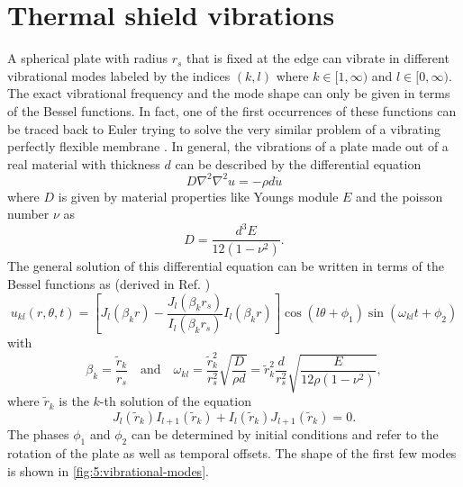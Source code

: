 \section{Thermal shield vibrations}\label{sec:5:thermal-vibrations}
A spherical plate with radius $r_s$ that is fixed at the edge can vibrate in different vibrational modes labeled by the indices $(k,l)$ where $k \in [1,\infty)$ and $l \in [0, \infty)$.
The exact vibrational frequency and the mode shape can only be given in terms of the Bessel functions. In fact, one of the first occurrences of these functions can be traced back to Euler trying to solve the very similar problem of a vibrating perfectly flexible membrane \cite{Dutka_1995}.
In general, the vibrations of a plate made out of a real material with thickness $d$ can be described by the differential equation \cite[p. 490]{Rao_2019}
\begin{equation}
  D \nabla^2\nabla^2 u = -\rho d \ddot{u}
\end{equation} 
where $D$ is given by material properties like Youngs module $E$ and the poisson number $\nu$ as
\begin{equation}
  D = \frac{d^3 E}{12(1-\nu^2)} .
\end{equation}
The general solution of this differential equation can be written in terms of the Bessel functions as (derived in Ref. \cite[p. 490-495]{Rao_2019}) 
\begin{equation}
  u_{kl}(r, \theta, t) = \left[J_l(\beta_k r) - \frac{J_l(\beta_k r_s)}{I_l(\beta_k r_s)}I_l(\beta_k r)\right]\cos(l\theta+\phi_1)\sin(\omega_{kl}t+\phi_2)
\end{equation}
with
\begin{equation} \label{eq:5:vibration-frequency}
  \beta_k = \frac{\tilde{r}_k}{r_s} \quad \text{and} \quad \omega_{kl} = \frac{\tilde{r}_k^2}{r_s^2}\sqrt{\frac{D}{\rho d}} = \tilde{r}_k^2\frac{d}{r_s^2}\sqrt{\frac{E}{12\rho(1-\nu^2)}} ,
\end{equation}
where $\tilde{r}_k$ is the $k$-th solution of the equation
\begin{equation}\label{eq:5:bessel-zeros}
  J_l(\tilde{r}_k)I_{l+1}(\tilde{r}_k)+I_l(\tilde{r}_k)J_{l+1}(\tilde{r}_k) = 0 .
\end{equation}
The phases $\phi_1$ and $\phi_2$ can be determined by initial conditions and refer to the rotation of the plate as well as temporal offsets. The shape of the first few modes is shown in \cref{fig:5:vibrational-modes}.
